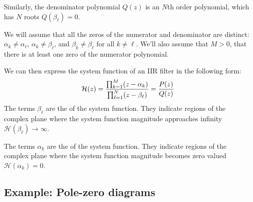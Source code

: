 Similarly, the denominator polynomial $Q(z)$ is an $N$th order
polynomial, which has $N$ roots $Q(\beta_{\ell})=0$. 

We will assume that all the zeros of the numerator and denominator
are distinct: $\alpha_{k} \ne \alpha_{\ell}$,
$\alpha_{k} \ne \beta_{\ell}$, and $\beta_{k} \ne \beta_{\ell}$ for
all $k\ne \ell$. We'll also assume that $M>0$, that there is at least
one zero of the numerator polynomial.

We can then express the system function of an IIR filter in the
following form:
\begin{equation}
\mathcal{H}(z) = \frac{\prod_{k=1}^{M}(z-\alpha_{k})}{\prod_{\ell=1}^{N}(z-\beta_{\ell} )} = \frac{P(z)}{Q(z)}
\end{equation}
The terms $\beta_{\ell}$ are the \emph{} of the
system function. They indicate regions of the complex plane where the
system function magnitude approaches infinity
$\mathcal{H}(\beta_{\ell})\rightarrow \infty$.

The terms $\alpha_{k}$ are the \emph{} of the
system function. They indicate regions of the complex plane where the
system function magnitude becomes zero valued $\mathcal{H}(\alpha_{k}) = 0$.

\subsection{Example: Pole-zero diagrams}

